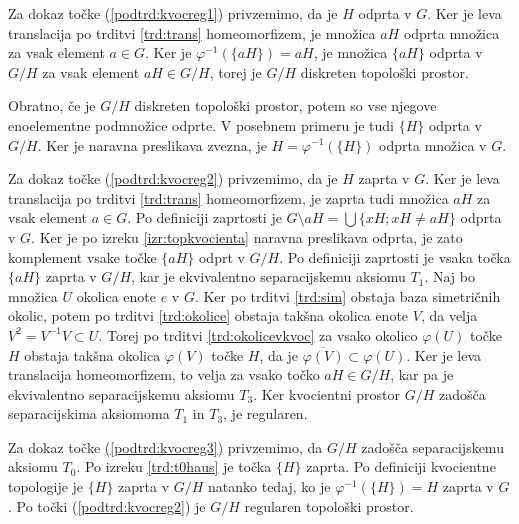 \documentclass[mat1]{fmfdelo}
\newcommand{\closure}[1]{\overline{#1}}
\begin{document}
\begin{dokaz}
Za dokaz točke (\ref{podtrd:kvocreg1}) privzemimo, da je $H$ odprta v $G$. Ker je leva translacija po trditvi \ref{trd:trans} homeomorfizem, je množica $aH$ odprta množica za vsak element $a \in G$. Ker je $\varphi^{-1}(\lbrace aH \rbrace) = aH$, je množica $\lbrace aH \rbrace$ odprta v $G/H$ za vsak element $aH \in G/H$, torej je $G/H$ diskreten topološki prostor.

Obratno, če je $G/H$ diskreten topološki prostor, potem so vse njegove eno\-e\-le\-ment\-ne podmnožice odprte. V posebnem primeru je tudi $\lbrace H \rbrace$ odprta v $G/H$. Ker je naravna preslikava zvezna, je $H = \varphi^{-1}(\lbrace H \rbrace)$ odprta množica v $G$.

Za dokaz točke (\ref{podtrd:kvocreg2}) privzemimo, da je $H$ zaprta v $G$. Ker je leva translacija po trditvi \ref{trd:trans} homeomorfizem, je zaprta tudi množica $aH$ za vsak element $a \in G$. Po definiciji zaprtosti je $G\setminus aH = \bigcup \lbrace xH ; xH \neq aH \rbrace$ odprta v $G$. Ker je po izreku \ref{izr:topkvocienta} naravna preslikava odprta, je zato komplement vsake točke $\lbrace aH \rbrace$ odprt v $G/H$. Po definiciji zaprtosti je vsaka točka $\lbrace aH \rbrace$ zaprta v $G/H$, kar je ekvivalentno separacijskemu aksiomu $T_1$. 
Naj bo množica $U$ okolica enote $e$ v $G$. Ker po trditvi \ref{trd:sim} obstaja baza simetričnih okolic, potem po trditvi \ref{trd:okolice} obstaja takšna okolica enote $V$, da velja $V^2 = V^{-1}V \subset U$. Torej po trditvi \ref{trd:okolicevkvoc} za vsako okolico $\varphi(U)$ točke $H$ obstaja takšna okolica $\varphi(V)$ točke $H$, da je $\closure{\varphi(V)} \subset \varphi(U)$.
Ker je leva translacija homeomorfizem, to velja za vsako točko $aH \in G/H$, kar pa je ekvivalentno separacijskemu aksiomu $T_3$. Ker kvocientni prostor $G/H$ zadošča separacijskima aksiomoma $T_1$ in $T_3$, je regularen.

Za dokaz točke (\ref{podtrd:kvocreg3}) privzemimo, da $G/H$ zadošča separacijskemu aksiomu $T_0$. Po izreku \ref{trd:t0haus} je točka $\lbrace H \rbrace$ zaprta. Po definiciji kvocientne topologije je $\lbrace H \rbrace$ zaprta v $G/H$ natanko tedaj, ko je $\varphi^{-1}(\lbrace H \rbrace) = H$ zaprta v $G$. Po točki (\ref{podtrd:kvocreg2}) je $G/H$ regularen topološki prostor.
\end{dokaz}
\end{document}
